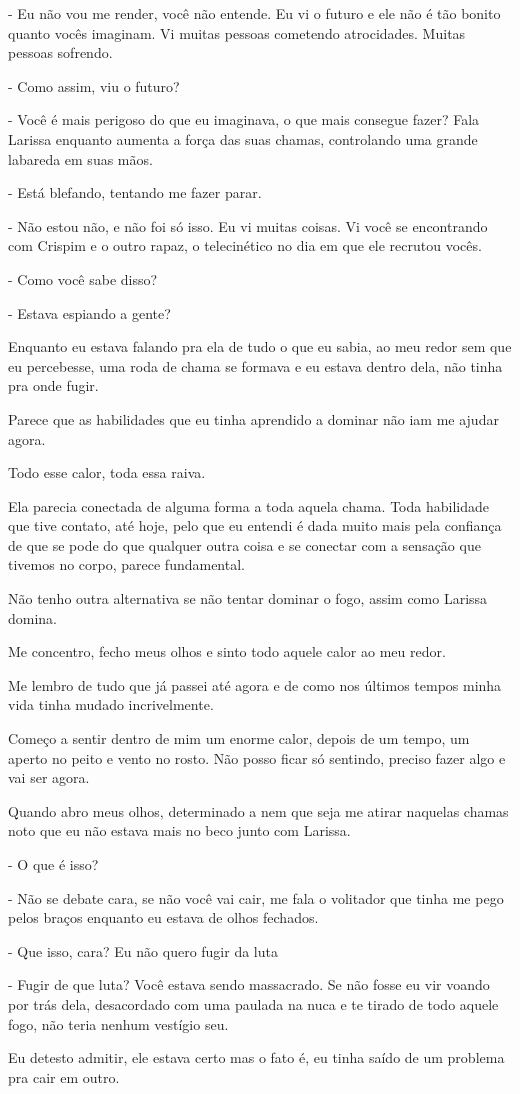 - Eu não vou me render, você não entende. Eu vi o futuro e ele não é tão bonito quanto vocês imaginam. Vi muitas pessoas cometendo atrocidades. Muitas pessoas sofrendo.

- Como assim, viu o futuro?

- Você é mais perigoso do que eu imaginava, o que mais consegue fazer? Fala Larissa enquanto aumenta a força das suas chamas, controlando uma grande labareda em suas mãos.

- Está blefando, tentando me fazer parar. 

- Não estou não, e não foi só isso. Eu vi muitas coisas. Vi você se encontrando com Crispim e o outro rapaz, o telecinético no dia em que ele recrutou vocês.

- Como você sabe disso?

- Estava espiando a gente?

Enquanto eu estava falando pra ela de tudo o que eu sabia, ao meu redor sem que eu percebesse, uma roda de chama se formava e eu estava dentro dela, não tinha pra onde fugir.

Parece que as habilidades que eu tinha aprendido a dominar não iam me ajudar agora.

Todo esse calor, toda essa raiva.

Ela parecia conectada de alguma forma a toda aquela chama. Toda habilidade que tive contato, até hoje, pelo que eu entendi é dada muito mais pela confiança de que se pode do que qualquer outra coisa e se conectar com a sensação que tivemos no corpo, parece fundamental.

Não tenho outra alternativa se não tentar dominar o fogo, assim como Larissa domina.

Me concentro, fecho meus olhos e sinto todo aquele calor ao meu redor.

Me lembro de tudo que já passei até agora e de como nos últimos tempos minha vida tinha mudado incrivelmente.

Começo a sentir dentro de mim um enorme calor, depois de um tempo, um aperto no peito e vento no rosto. Não posso ficar só sentindo, preciso fazer algo e vai ser agora.

Quando abro meus olhos, determinado a nem que seja me atirar naquelas chamas noto que eu não estava mais no beco junto com Larissa.

- O que é isso?

- Não se debate cara, se não você vai cair, me fala o volitador que tinha me pego pelos braços enquanto eu estava de olhos fechados.

- Que isso, cara? Eu não quero fugir da luta

- Fugir de que luta? Você estava sendo massacrado. Se não fosse eu vir voando por trás dela, desacordado com uma paulada na nuca e te tirado de todo aquele fogo, não teria nenhum vestígio seu.

Eu detesto admitir, ele estava certo mas o fato é, eu tinha saído de um problema pra cair em outro.